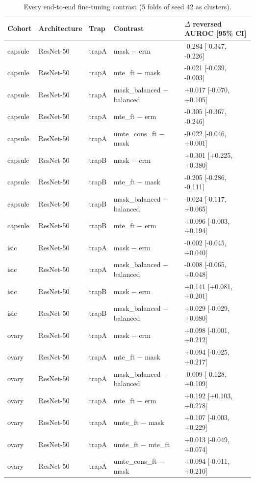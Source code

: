 \begin{table}[H]\centering\scriptsize
\caption{Every end-to-end fine-tuning contrast (5 folds of seed 42 as clusters).}\label{tab:ft}
\begin{tabular}{lllll}\toprule
Cohort & Architecture & Trap & Contrast & $\Delta$ reversed AUROC [95\% CI] \\\midrule
capsule & ResNet-50 & trapA & mask $-$ erm & -0.284 [-0.347, -0.226] \\
capsule & ResNet-50 & trapA & mte\_ft $-$ mask & -0.021 [-0.039, -0.003] \\
capsule & ResNet-50 & trapA & mask\_balanced $-$ balanced & +0.017 [-0.070, +0.105] \\
capsule & ResNet-50 & trapA & mte\_ft $-$ erm & -0.305 [-0.367, -0.246] \\
capsule & ResNet-50 & trapA & umte\_cons\_ft $-$ mask & -0.022 [-0.046, +0.001] \\
capsule & ResNet-50 & trapB & mask $-$ erm & +0.301 [+0.225, +0.380] \\
capsule & ResNet-50 & trapB & mte\_ft $-$ mask & -0.205 [-0.286, -0.111] \\
capsule & ResNet-50 & trapB & mask\_balanced $-$ balanced & -0.024 [-0.117, +0.065] \\
capsule & ResNet-50 & trapB & mte\_ft $-$ erm & +0.096 [-0.003, +0.194] \\
isic & ResNet-50 & trapA & mask $-$ erm & -0.002 [-0.045, +0.040] \\
isic & ResNet-50 & trapA & mask\_balanced $-$ balanced & -0.008 [-0.065, +0.048] \\
isic & ResNet-50 & trapB & mask $-$ erm & +0.141 [+0.081, +0.201] \\
isic & ResNet-50 & trapB & mask\_balanced $-$ balanced & +0.029 [-0.029, +0.080] \\
ovary & ResNet-50 & trapA & mask $-$ erm & +0.098 [-0.001, +0.212] \\
ovary & ResNet-50 & trapA & mte\_ft $-$ mask & +0.094 [-0.025, +0.217] \\
ovary & ResNet-50 & trapA & mask\_balanced $-$ balanced & -0.009 [-0.128, +0.109] \\
ovary & ResNet-50 & trapA & mte\_ft $-$ erm & +0.192 [+0.103, +0.278] \\
ovary & ResNet-50 & trapA & umte\_ft $-$ mask & +0.107 [-0.003, +0.229] \\
ovary & ResNet-50 & trapA & umte\_ft $-$ mte\_ft & +0.013 [-0.049, +0.074] \\
ovary & ResNet-50 & trapA & umte\_cons\_ft $-$ mask & +0.094 [-0.011, +0.210] \\

\end{tabular}
\end{table}
